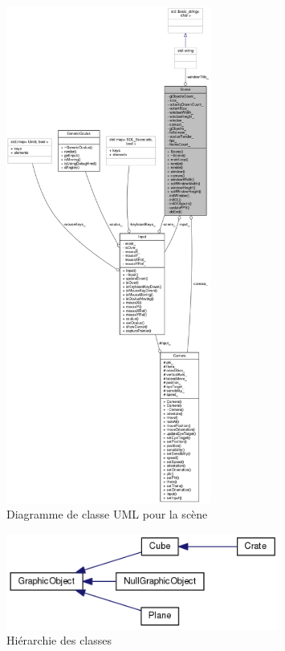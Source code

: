 \documentclass[a4paper,french,12pt]{article}
\begin{document}
	    \begin{figure}
			      \centering
			      \includegraphics[width=0.6\textwidth]{uml2.png}
			      \caption{Diagramme de classe UML pour la scène}
	    \end{figure}
	    
	    \begin{figure}
			      \centering
			      \includegraphics[width=0.8\textwidth]{hierarchy3.png}
			      \caption{Hiérarchie des classes}
	    \end{figure}
	    
\end{document}
